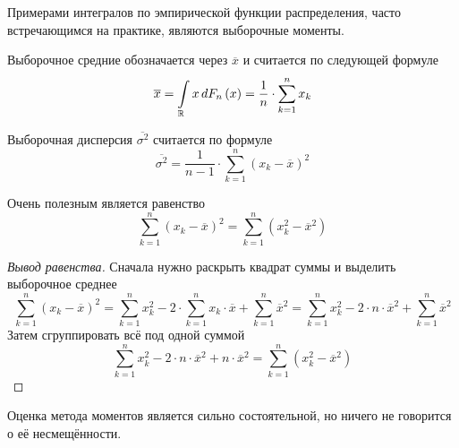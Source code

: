 Примерами интегралов по эмпирической функции распределения, часто встречающимся
на практике, являются выборочные моменты.

\begin{definition}
  Выборочное средние обозначается через $\overline{x}$
  и считается по следующей формуле
  \begin{equation*}
    \overline{x}
    = \integrall{\mathbb{R}}{d\cdfn{x}}{x}
    = \frac{1}{n} \cdot \sum_{k=1}^{n} x_k
  \end{equation*}
\end{definition}

\begin{definition}
  Выборочная дисперсия $\overline{\sigma^2}$
  считается по формуле
  \begin{equation*}
    \overline{\sigma^2}
    = \frac{1}{n-1} \cdot \sum_{k=1}^n \left( x_k-\overline{x} \right)^2
  \end{equation*}
\end{definition}

\begin{remark}
  Очень полезным является равенство
  \begin{equation*}
    \sum_{k=1}^{n} \left( x_k - \overline{x} \right)^2
    = \sum_{k=1}^{n} \left( x_k^2 - \overline{x}^2 \right)
  \end{equation*}
\end{remark}
\begin{proof}[Вывод равенства]
  Сначала нужно раскрыть квадрат суммы и выделить выборочное среднее
  \begin{equation*}
    \sum_{k=1}^{n} \left( x_k - \overline{x} \right)^2
    = \sum_{k=1}^{n} x_k^2 - 2 \cdot \sum_{k=1}^{n} x_k \cdot \overline{x}
      + \sum_{k=1}^{n} \overline{x}^2
    = \sum_{k=1}^{n} x_k^2 - 2 \cdot n \cdot \overline{x}^2
      + \sum_{k=1}^{n} \overline{x}^2
  \end{equation*}
  Затем сгруппировать всё под одной суммой
  \begin{equation*}
    \sum_{k=1}^{n} x_k^2 - 2 \cdot n \cdot \overline{x}^2
      + n \cdot \overline{x}^2
    = \sum_{k=1}^{n} \left( x_k^2 - \overline{x}^2 \right)
  \end{equation*}
\end{proof}

\begin{remark}
  Оценка метода моментов является сильно состоятельной, но ничего не говорится
  о её несмещённости.
\end{remark}

